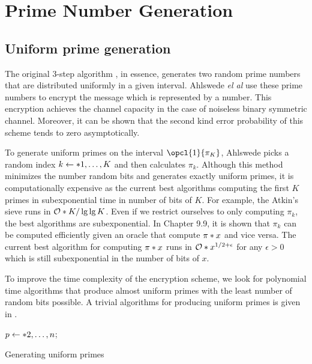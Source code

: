\section{Prime Number Generation}
\subsection{Uniform prime generation}\label{subsec:unifprime}
The original 3-step algorithm \cite{multiway}, in essence, generates two random prime numbers that are distributed uniformly in a given interval. Ahlswede \textit{el al} use these prime numbers to encrypt the message which is represented by a number. This encryption achieves the channel capacity in the case of noiseless binary symmetric channel. Moreover, it can be shown that the second kind error probability of this scheme tends to zero asymptotically. 

To generate uniform primes on the interval \(\opcl{1}{\pi_K}\), Ahlswede picks a random index \(k \gets \set{1, \dots, K}\) and then calculates \(\pi_k\). Although this method minimizes the number random bits and generates exactly uniform primes, it is computationally expensive as the current best algorithms computing the first \(K\) primes in subexponential time in number of bits of \(K\). For example, the Atkin's sieve \cite{atkin} runs in \(\bigO{K / \lg \lg K}\). Even if we restrict ourselves to only computing \(\pi_k\), the best algorithms are subexponential. In \cite{bach} Chapter 9.9, it is shown that \(\pi_k\) can be computed efficiently given an oracle that compute \(\func{\pi}{x}\) and vice versa. The current best algorithm for computing \(\func{\pi}{x}\) \cite{lagarias} runs in \(\bigO{x^{1/2 + \epsilon}}\) for any \(\epsilon > 0\) which is still subexponential in the number of bits of \(x\).  

To improve the time complexity of the encryption scheme, we look for polynomial time algorithms that produce almost uniform primes with the least number of random bits possible. A trivial algorithms for producing uniform primes is given in .
\begin{algorithm}
	\DontPrintSemicolon
    {
        \(p \gets \set{2,\dots, n}\);
    }
	\caption{Generating uniform primes}
    \label{alg:trivialPNG}
\end{algorithm}

